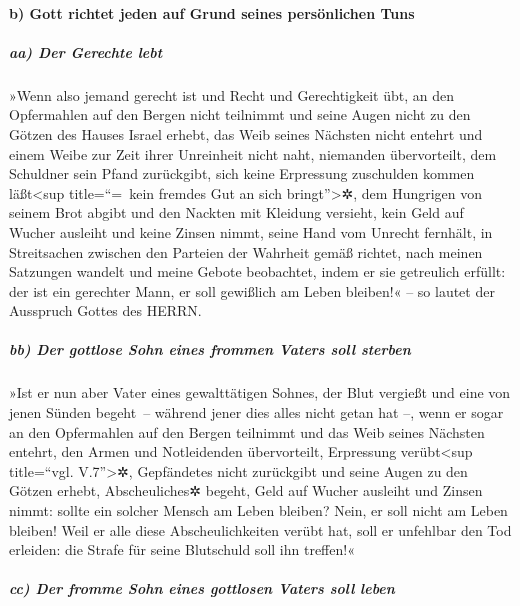 \hypertarget{b-gott-richtet-jeden-auf-grund-seines-persuxf6nlichen-tuns}{%
\paragraph{b) Gott richtet jeden auf Grund seines persönlichen
Tuns}\label{b-gott-richtet-jeden-auf-grund-seines-persuxf6nlichen-tuns}}

\hypertarget{aa-der-gerechte-lebt}{%
\subparagraph{aa) Der Gerechte lebt}\label{aa-der-gerechte-lebt}}

»Wenn also jemand gerecht ist und Recht und Gerechtigkeit
übt, an den Opfermahlen auf den Bergen nicht teilnimmt und
seine Augen nicht zu den Götzen des Hauses Israel erhebt, das Weib
seines Nächsten nicht entehrt und einem Weibe zur Zeit ihrer Unreinheit
nicht naht, niemanden übervorteilt, dem Schuldner sein
Pfand zurückgibt, sich keine Erpressung zuschulden kommen
läßt\textless sup title=``=~kein fremdes Gut an sich
bringt''\textgreater✲, dem Hungrigen von seinem Brot abgibt und den
Nackten mit Kleidung versieht, kein Geld auf Wucher
ausleiht und keine Zinsen nimmt, seine Hand vom Unrecht fernhält, in
Streitsachen zwischen den Parteien der Wahrheit gemäß richtet,
nach meinen Satzungen wandelt und meine Gebote beobachtet,
indem er sie getreulich erfüllt: der ist ein gerechter Mann, er soll
gewißlich am Leben bleiben!« -- so lautet der Ausspruch Gottes des
HERRN.

\hypertarget{bb-der-gottlose-sohn-eines-frommen-vaters-soll-sterben}{%
\subparagraph{bb) Der gottlose Sohn eines frommen Vaters soll
sterben}\label{bb-der-gottlose-sohn-eines-frommen-vaters-soll-sterben}}

»Ist er nun aber Vater eines gewalttätigen Sohnes, der
Blut vergießt und eine von jenen Sünden begeht~-- während
jener dies alles nicht getan hat --, wenn er sogar an den Opfermahlen
auf den Bergen teilnimmt und das Weib seines Nächsten entehrt,
den Armen und Notleidenden übervorteilt, Erpressung
verübt\textless sup title=``vgl. V.7''\textgreater✲, Gepfändetes nicht
zurückgibt und seine Augen zu den Götzen erhebt, Abscheuliches✲ begeht,
Geld auf Wucher ausleiht und Zinsen nimmt: sollte ein
solcher Mensch am Leben bleiben? Nein, er soll nicht am Leben bleiben!
Weil er alle diese Abscheulichkeiten verübt hat, soll er unfehlbar den
Tod erleiden: die Strafe für seine Blutschuld soll ihn treffen!«

\hypertarget{cc-der-fromme-sohn-eines-gottlosen-vaters-soll-leben}{%
\subparagraph{cc) Der fromme Sohn eines gottlosen Vaters soll
leben}\label{cc-der-fromme-sohn-eines-gottlosen-vaters-soll-leben}}

